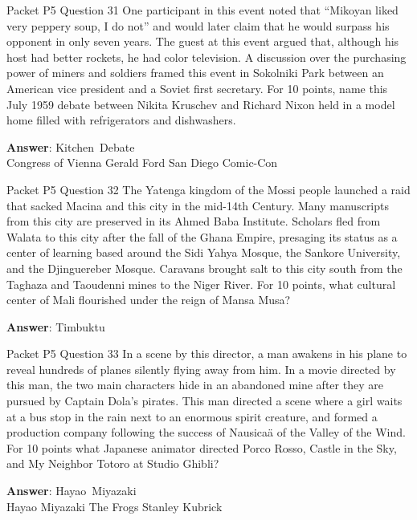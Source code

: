 \begin{frame}{Packet P5 Question 31}
One participant in this event noted that “Mikoyan liked very peppery soup, I do not” and would later claim that he would surpass his opponent in only seven years. The guest at this event argued that, although his host had better rockets, he had color television. A discussion over the purchasing power of miners and soldiers framed this event in Sokolniki Park between an American vice president and a Soviet first secretary. For 10 points, name this July 1959 debate between Nikita Kruschev and Richard Nixon held in a model   home filled with refrigerators and dishwashers.      

\textbf{Answer}: Kitchen\ Debate\\
 Congress of Vienna
 Gerald Ford
 San Diego Comic-Con
\end{frame}

\begin{frame}{Packet P5 Question 32}
The Yatenga kingdom of the Mossi people launched a raid that sacked Macina and this city in the mid-14th Century. Many manuscripts from this city are preserved in its Ahmed Baba Institute. Scholars fled from Walata to this city after the fall of the Ghana Empire, presaging its status as a center of learning based around the Sidi Yahya Mosque,   the Sankore University,   and the Djinguereber Mosque. Caravans     brought salt to this city south from the Taghaza and Taoudenni mines to the Niger River. For 10 points, what cultural center of Mali flourished under the reign of Mansa Musa?

\textbf{Answer}: Timbuktu\\
\end{frame}

\begin{frame}{Packet P5 Question 33}
In a scene by this director, a man awakens in his plane to reveal hundreds of planes silently flying away from him. In a movie directed by this man, the two main characters hide in an abandoned mine after they are pursued by Captain Dola's pirates. This man directed a scene where a girl waits at a bus stop in the rain next to an enormous spirit creature, and formed   a production company following the success of Nausicaä of the Valley of the Wind. For 10 points what Japanese animator directed Porco Rosso, Castle in the Sky, and My Neighbor Totoro at Studio Ghibli?      

\textbf{Answer}: Hayao\ Miyazaki\\
 Hayao Miyazaki
 The Frogs
 Stanley Kubrick
\end{frame}

